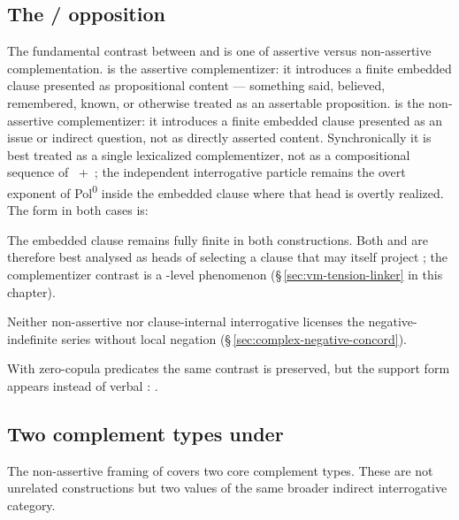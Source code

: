 \subsection{The  /  opposition}

The fundamental contrast between  and  is one of assertive
versus non-assertive complementation.  is the assertive complementizer:
it introduces a finite embedded clause presented as propositional content ---
something said, believed, remembered, known, or otherwise treated as an
assertable proposition.  is the non-assertive complementizer: it
introduces a finite embedded clause presented as an issue or indirect question,
not as directly asserted content. Synchronically it is best treated as a
single lexicalized complementizer, not as a compositional sequence of
~+~; the independent interrogative particle  remains the
overt exponent of Pol\textsuperscript{0} inside the embedded clause where that
head is overtly realized. The form in both cases is:

\begin{center}
\end{center}

The embedded clause remains fully finite in both constructions. Both 
and  are therefore best analysed as heads of  selecting a
clause that may itself project ; the complementizer contrast is a
-level phenomenon (§\,\ref{sec:vm-tension-linker} in
this chapter).

Neither non-assertive  nor clause-internal interrogative 
licenses the negative-indefinite series without local negation
(§\,\ref{sec:complex-negative-concord}).

With zero-copula predicates the same contrast is preserved, but the support form
 appears instead of verbal : .

\subsection{Two complement types under }

The non-assertive framing of  covers two core complement types. These
are not unrelated constructions but two values of the same broader indirect
interrogative category.

